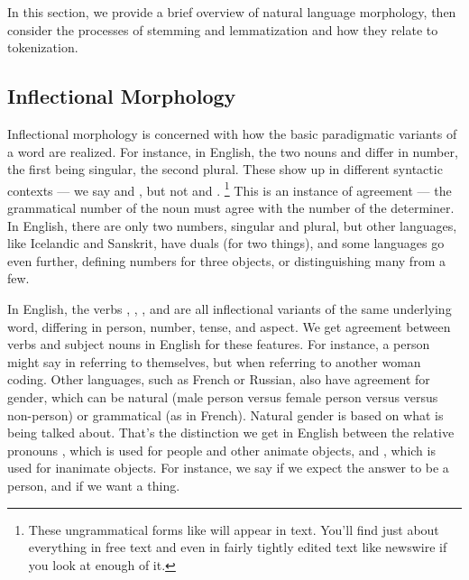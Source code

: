 In this section, we provide a brief overview of natural language
morphology, then consider the processes of stemming and
lemmatization and how they relate to tokenization.   

\subsection{Inflectional Morphology}

Inflectional morphology is concerned with how the basic paradigmatic
variants of a word are realized.  For instance, in English, the two
nouns  and  differ in number, the first
being singular, the second plural.  These show up in different
syntactic contexts --- we say  and
, but not 
and .%
%
\footnote{These ungrammatical forms like 
will appear in text.  You'll find just about everything in free text
and even in fairly tightly edited text like newswire if you look at
enough of it.}
%
This is an instance of agreement --- the grammatical number of the
noun must agree with the number of the determiner.  In English, there
are only two numbers, singular and plural, but other languages, like
Icelandic and Sanskrit, have duals (for two things), and some
languages go even further, defining numbers for three objects, or
distinguishing many from a few.

In English, the verbs , , , and
 are all inflectional variants of the same underlying word,
differing in person, number, tense, and aspect.  We get agreement
between verbs and subject nouns in English for these features.  For
instance, a person might say  in referring to
themselves, but  when referring to another
woman coding.  Other languages, such as French or Russian, also have
agreement for gender, which can be natural (male person versus female
person versus versus non-person) or grammatical (as in French).
Natural gender is based on what is being talked about.  That's the
distinction we get in English between the relative pronouns
, which is used for people and other animate
objects, and , which is used for inanimate
objects.  For instance, we say  if
we expect the answer to be a person, and 
 if we want a thing.


